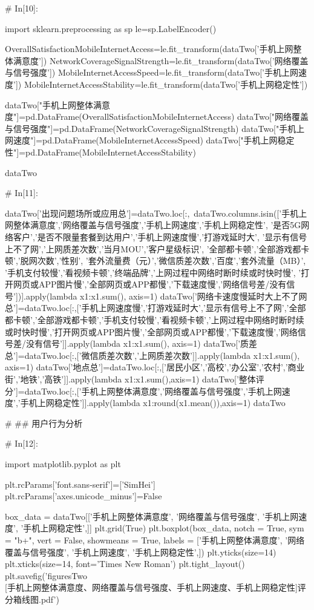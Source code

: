 \documentclass{MathorCupmodeling}
\begin{document}
\begin{python}
# In[10]:


import sklearn.preprocessing as sp
le=sp.LabelEncoder()

OverallSatisfactionMobileInternetAccess=le.fit_transform(dataTwo['手机上网整体满意度'])
NetworkCoverageSignalStrength=le.fit_transform(dataTwo['网络覆盖与信号强度'])
MobileInternetAccessSpeed=le.fit_transform(dataTwo['手机上网速度'])
MobileInternetAccessStability=le.fit_transform(dataTwo['手机上网稳定性'])

dataTwo["手机上网整体满意度"]=pd.DataFrame(OverallSatisfactionMobileInternetAccess)
dataTwo["网络覆盖与信号强度"]=pd.DataFrame(NetworkCoverageSignalStrength)
dataTwo["手机上网速度"]=pd.DataFrame(MobileInternetAccessSpeed)
dataTwo["手机上网稳定性"]=pd.DataFrame(MobileInternetAccessStability)

dataTwo


# In[11]:


dataTwo['出现问题场所或应用总']=dataTwo.loc[:,~dataTwo.columns.isin(['手机上网整体满意度','网络覆盖与信号强度','手机上网速度','手机上网稳定性', '是否5G网络客户','是否不限量套餐到达用户','手机上网速度慢','打游戏延时大', '显示有信号上不了网','上网质差次数','当月MOU','客户星级标识', '全部都卡顿','全部游戏都卡顿','脱网次数','性别', '套外流量费（元）','微信质差次数','百度','套外流量（MB）', '手机支付较慢','看视频卡顿','终端品牌','上网过程中网络时断时续或时快时慢', '打开网页或APP图片慢','全部网页或APP都慢','下载速度慢','网络信号差/没有信号'])].apply(lambda x1:x1.sum(), axis=1)
dataTwo['网络卡速度慢延时大上不了网总']=dataTwo.loc[:,['手机上网速度慢','打游戏延时大','显示有信号上不了网','全部都卡顿','全部游戏都卡顿','手机支付较慢','看视频卡顿','上网过程中网络时断时续或时快时慢','打开网页或APP图片慢','全部网页或APP都慢','下载速度慢','网络信号差/没有信号']].apply(lambda x1:x1.sum(), axis=1)
dataTwo['质差总']=dataTwo.loc[:,['微信质差次数','上网质差次数']].apply(lambda x1:x1.sum(), axis=1)
dataTwo['地点总']=dataTwo.loc[:,['居民小区','高校','办公室','农村','商业街','地铁','高铁']].apply(lambda x1:x1.sum(),axis=1)
dataTwo['整体评分']=dataTwo.loc[:,['手机上网整体满意度','网络覆盖与信号强度','手机上网速度','手机上网稳定性']].apply(lambda x1:round(x1.mean()),axis=1)
dataTwo


# ## 用户行为分析

# In[12]:


import matplotlib.pyplot as plt

plt.rcParams['font.sans-serif']=['SimHei']
plt.rcParams['axes.unicode_minus']=False

box_data = dataTwo[['手机上网整体满意度',
                    '网络覆盖与信号强度',
                    '手机上网速度',
                    '手机上网稳定性',]]
plt.grid(True)
plt.boxplot(box_data,
            notch = True,
            sym = "b+",
            vert = False,
            showmeans = True,
            labels = ['手机上网整体满意度',
                      '网络覆盖与信号强度',
                      '手机上网速度',
                      '手机上网稳定性',])
plt.yticks(size=14)
plt.xticks(size=14, font='Times New Roman')
plt.tight_layout()
plt.savefig('figuresTwo\\[附件2][手机上网整体满意度、网络覆盖与信号强度、手机上网速度、手机上网稳定性]评分箱线图.pdf')



\end{python}
\end{document}
